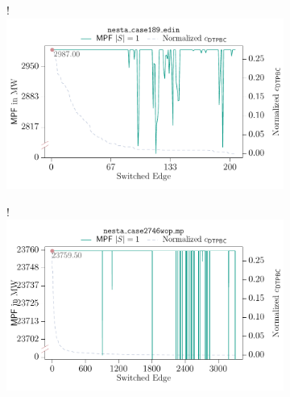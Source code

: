 \begin{center}%
    \begin{figure}[t!]%
        \begin{subfigure}[b]{.498\textwidth}%
            \centering%
            \resizebox {\columnwidth} {!} {%
                \includegraphics{switchplacement/plots/plot-SwitchingBetweenness_nesta_case189_edin-dtpbc-mpf-cutY-StandAlone.pdf}%
            }%
            \label{ch:switching:sec:evaluation:plot:a:SwitchingBetweenness_nesta_case189_edin_dtpbc_mpf_cutY}%
            \caption{}%
        \end{subfigure}%
        \hfill%
        \begin{subfigure}[b]{.498\textwidth}%
            \centering%
            \resizebox {\columnwidth} {!} {%
                \includegraphics{switchplacement/plots/plot-SwitchingBetweenness_nesta_case2746wop_mp-dtpbc-mpf-cutY-StandAlone.pdf}%
            }%
            \label{ch:switching:sec:evaluation:plot:a:SwitchingBetweenness_nesta_case2746sp_mp_dtpbc_mpf_cutY}%
            \caption{}%
        \end{subfigure}%
    

\end{figure}
\end{center}
